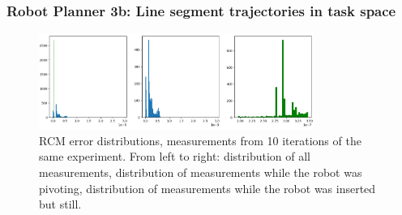 \begin{frame}
\frametitle{Robot Planner 3b: Line segment trajectories in task space}
\begin{center}
\begin{figure}[!htb]
\centering
\includegraphics[width=0.8\textwidth]{../images/robot_planner3/robot_planner3b-error_distributions.png}
\caption{RCM error distributions, measurements from 10 iterations of the same experiment. From left to right: distribution of all measurements, distribution of measurements while the robot was pivoting, 
distribution of measurements while the robot was inserted but still.}
\end{figure}

\end{center}
\end{frame}

